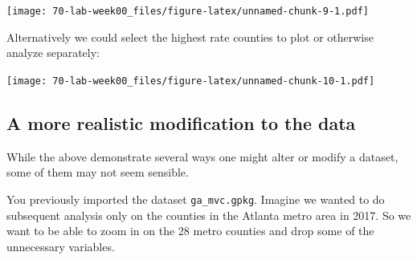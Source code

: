 \documentclass[
]{book}
\newenvironment{Shaded}{\begin{snugshade}}{\end{snugshade}}
\newcommand{\AttributeTok}[1]{\textcolor[rgb]{0.77,0.63,0.00}{#1}}
\newcommand{\CommentTok}[1]{\textcolor[rgb]{0.56,0.35,0.01}{\textit{#1}}}
\newcommand{\DecValTok}[1]{\textcolor[rgb]{0.00,0.00,0.81}{#1}}
\newcommand{\FunctionTok}[1]{\textcolor[rgb]{0.00,0.00,0.00}{#1}}
\newcommand{\NormalTok}[1]{#1}
\newcommand{\OtherTok}[1]{\textcolor[rgb]{0.56,0.35,0.01}{#1}}
\newcommand{\SpecialCharTok}[1]{\textcolor[rgb]{0.00,0.00,0.00}{#1}}
\newcommand{\StringTok}[1]{\textcolor[rgb]{0.31,0.60,0.02}{#1}}
\begin{document}
\begin{Shaded}
\end{Shaded}

\texttt{[image: 70-lab-week00\_files/figure-latex/unnamed-chunk-9-1.pdf]}

Alternatively we could select the highest rate counties to plot or otherwise analyze separately:

\begin{Shaded}
\end{Shaded}

\texttt{[image: 70-lab-week00\_files/figure-latex/unnamed-chunk-10-1.pdf]}

\hypertarget{a-more-realistic-modification-to-the-data}{%
\subsection{A more realistic modification to the data}\label{a-more-realistic-modification-to-the-data}}

While the above demonstrate several ways one might alter or modify a dataset, some of them may not seem sensible.

You previously imported the dataset \texttt{ga\_mvc.gpkg}. Imagine we wanted to do subsequent analysis only on the counties in the Atlanta metro area in 2017. So we want to be able to zoom in on the 28 metro counties and drop some of the unnecessary variables.
\end{document}
